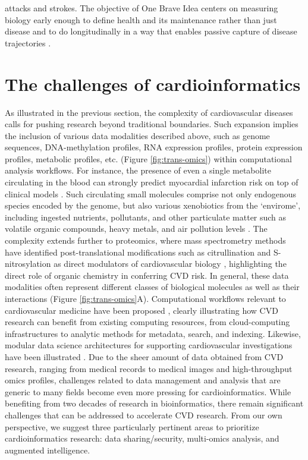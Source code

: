 \documentclass[letter]{bib}
\begin{document}
attacks and strokes.  The objective of One Brave Idea centers on measuring biology early enough to define health and its maintenance rather than just disease and to do longitudinally in a way that enables passive capture of disease trajectories \citep{Cranley:2018:New}.    
	
	\section*{The challenges of cardioinformatics}
	As illustrated in the previous section, the complexity of cardiovascular diseases calls for pushing research beyond traditional boundaries.
	Such expansion implies the inclusion of various data modalities described above, such as genome sequences, DNA-methylation profiles, RNA expression profiles, protein expression profiles, metabolic profiles, etc. (Figure \ref{fig:trans-omics}) within computational analysis workflows.  For instance, the presence of even a single metabolite circulating in the blood can strongly predict myocardial infarction risk on top of clinical models \citep{mcgarrah:2018:cardiovascular}.  Such circulating small molecules comprise not only endogenous species encoded by the genome, but also various xenobiotics from the `envirome', including ingested nutrients, pollutants, and other particulate matter such as volatile organic compounds, heavy metals, and air pollution levels \citep{Lau:2018:Omics,Riggs:2018:Defining,Brook:2010:Particulate}.  The complexity extends further to proteomics, where mass spectrometry methods have identified post-translational modifications such as citrullination and S-nitrosylation as direct modulators of cardiovascular biology \citep{Fert-Bober:2018:Precision}, highlighting the direct role of organic chemistry \citep{McMahon:2017:Survival} in conferring CVD risk.  In general, these data modalities often represent different classes of biological molecules as well as their interactions (Figure \ref{fig:trans-omics}A). Computational workflows relevant to cardiovascular medicine have been proposed \citep{Ping:2018:Biomedical}, clearly illustrating how CVD research can benefit from existing computing resources, from cloud-computing infrastructures to analytic methods for metadata, search, and indexing. Likewise, modular data science architectures for supporting cardiovascular investigations have been illustrated \citep{Khomtchouk:2019:HeartBioPortal,Scruggs:2015:harnessing}.  Due to the sheer amount of data obtained from CVD research, ranging from medical records to medical images and high-throughput omics profiles, challenges related to data management and analysis that are generic to many fields become even more pressing for cardioinformatics. While benefiting from two decades of research in bioinformatics, there remain significant challenges that can be addressed to accelerate CVD research. From our own perspective, we suggest three particularly pertinent areas to prioritize cardioinformatics research: data sharing/security, multi-omics analysis, and augmented intelligence.
	
\end{document}
